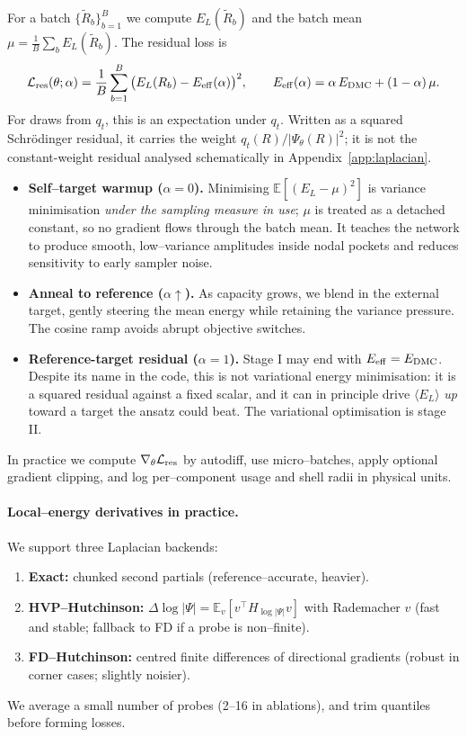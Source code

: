 For a batch $\{\tilde R_b\}_{b=1}^B$ we compute $E_L(\tilde R_b)$ and the batch mean $\mu=\frac{1}{B}\sum_b E_L(\tilde R_b)$.
The residual loss is
\begin{equation}
\mathcal{L}_{\rm res}(\theta; \alpha)
= \frac{1}{B}\sum_{b=1}^B \big(E_L(R_b)-E_{\rm eff}(\alpha)\big)^2,
\qquad
E_{\rm eff}(\alpha)=\alpha\,E_{\rm DMC}+(1-\alpha)\,\mu.
\end{equation}
For draws from $q_t$, this is an expectation under $q_t$. Written as a squared
Schrödinger residual, it carries the weight $q_t(R)/|\Psi_\theta(R)|^2$; it is not the
constant-weight residual analysed schematically in Appendix~\ref{app:laplacian}.
\begin{itemize}
  \item \textbf{Self–target warmup ($\alpha=0$).} Minimising $\mathbb{E}[(E_L-\mu)^2]$ is variance minimisation \emph{under the sampling measure in use}; $\mu$ is treated as a detached constant, so no gradient flows through the batch mean. It teaches the network to produce smooth, low–variance amplitudes inside nodal pockets and reduces sensitivity to early sampler noise.
  \item \textbf{Anneal to reference ($\alpha\uparrow$).} As capacity grows, we blend in the external target, gently steering the mean energy while retaining the variance pressure. The cosine ramp avoids abrupt objective switches.
  \item \textbf{Reference-target residual ($\alpha=1$).} Stage I may end with $E_{\rm eff}=E_{\rm DMC}$. Despite its name in the code, this is not variational energy minimisation: it is a squared residual against a fixed scalar, and it can in principle drive $\langle E_L\rangle$ \emph{up} toward a target the ansatz could beat. The variational optimisation is stage II.
\end{itemize}
In practice we compute $\nabla_\theta \mathcal{L}_{\rm res}$ by autodiff, use micro--batches, apply optional gradient clipping, and log per–component usage and shell radii in physical units.

\paragraph{Local–energy derivatives in practice.}
We support three Laplacian backends:
\begin{enumerate}
  \item \textbf{Exact:} chunked second partials (reference–accurate, heavier).
  \item \textbf{HVP–Hutchinson:} $\Delta \log|\Psi| = \mathbb{E}_v[v^\top H_{\log|\Psi|} v]$ with Rademacher $v$ (fast and stable; fallback to FD if a probe is non–finite).
  \item \textbf{FD–Hutchinson:} centred finite differences of directional gradients (robust in corner cases; slightly noisier).
\end{enumerate}
We average a small number of probes (2–16 in ablations), and trim quantiles before forming losses.

